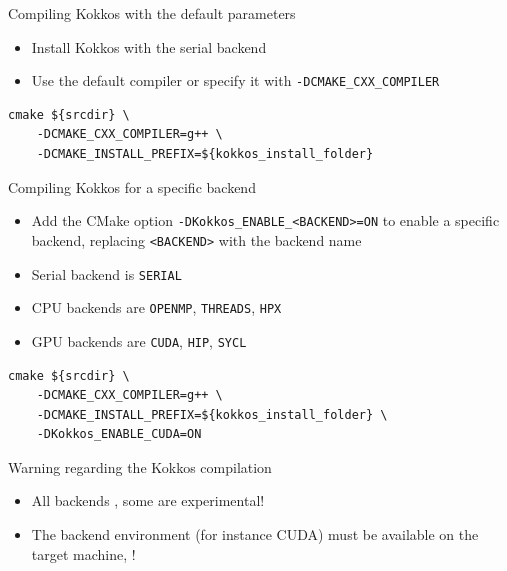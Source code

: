 \documentclass[aspectratio=169]{beamer}
\begin{document}

\begin{frame}[fragile]{Compiling Kokkos with the default parameters}
    \begin{itemize}
        \item Install Kokkos with the serial backend
        \item Use the default compiler or specify it with \texttt{-DCMAKE\_CXX\_COMPILER}
    \end{itemize}
    \begin{verbatim}
cmake ${srcdir} \
    -DCMAKE_CXX_COMPILER=g++ \
    -DCMAKE_INSTALL_PREFIX=${kokkos_install_folder}
    \end{verbatim}
\end{frame}


\begin{frame}[fragile]{Compiling Kokkos for a specific backend}
    \begin{itemize}
        \item Add the CMake option \texttt{-DKokkos\_ENABLE\_<BACKEND>=ON} to enable a specific backend, replacing \texttt{<BACKEND>} with the backend name
        \item Serial backend is \texttt{SERIAL}
        \item CPU backends are \texttt{OPENMP}, \texttt{THREADS}, \texttt{HPX}
        \item GPU backends are \texttt{CUDA}, \texttt{HIP}, \texttt{SYCL}
    \end{itemize}
    \begin{verbatim}
cmake ${srcdir} \
    -DCMAKE_CXX_COMPILER=g++ \
    -DCMAKE_INSTALL_PREFIX=${kokkos_install_folder} \
    -DKokkos_ENABLE_CUDA=ON
    \end{verbatim}
\end{frame}


\begin{frame}{Warning regarding the Kokkos compilation}
    \begin{itemize}
        \item All backends , some are experimental!
        \item The backend environment (for instance CUDA) must be available on the target machine, !
    \end{itemize}
\end{frame}
\end{document}
